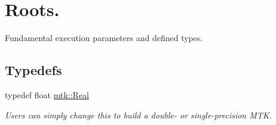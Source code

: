 \hypertarget{group__c01-roots}{\section{Roots.}
\label{group__c01-roots}
}


Fundamental execution parameters and defined types.  


\subsection*{Typedefs}
\begin{DoxyCompactItemize}
\item 
typedef float \hyperlink{group__c01-roots_gac080bbbf5cbb5502c9f00405f894857d}{mtk\-::\-Real}
\begin{DoxyCompactList}\small\item\em Users can simply change this to build a double-\/ or single-\/precision M\-T\-K. \end{DoxyCompactList}\end{DoxyCompactItemize}
